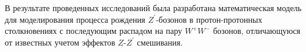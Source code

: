В результате проведенных исследований была разработана
математическая модель для моделирования процесса рождения ${Z}^{\prime}$-бозонов в протон-протонных столкновениях с последующим распадом на пару ${W}^{+}{W}^{-}$ бозонов, отличающуюся от известных учетом эффектов $Z$-${Z}^{\prime}$ смешивания.